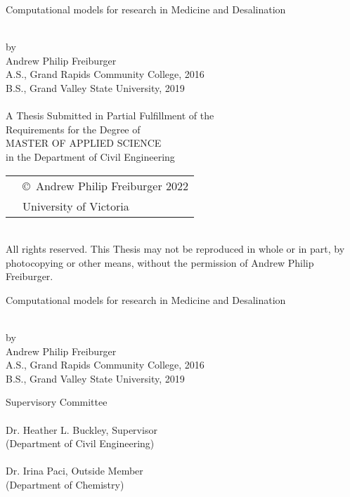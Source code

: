 \newcommand\thesistitle{
    Computational models for research in Medicine and Desalination 
}
\newcommand\nameanddegrees{
Andrew Philip Freiburger\\
A.S., Grand Rapids Community College, 2016\\
B.S., Grand Valley State University, 2019\\
}
\newcommand\panel{
    \HRule\\\panelist{Dr. Heather L. Buckley}{Supervisor}{Department of Civil Engineering}
    \HRule\\\panelist{Dr. Irina Paci}{Outside Member}{Department of Chemistry}
}

\newcommand\tpbreak{\\[\baselineskip]}
\newpage
\thispagestyle{empty}

\pagestyle{myheadings}

\pagebreak
{
    \centering
    \thesistitle
    \tpbreak
    
    by
    \tpbreak
    \nameanddegrees 
    \tpbreak
    A Thesis Submitted in Partial Fulfillment of the \\
    Requirements for the Degree of
    \tpbreak
    MASTER OF APPLIED SCIENCE
    \tpbreak
    in the Department of Civil Engineering\\
    \vfill
    \begin{tabular}{cl}
        & \copyright\ Andrew Philip Freiburger 2022\\
        & \phantom{\copyright} University of Victoria
    \end{tabular}
    \tpbreak
    All rights reserved. This Thesis may not be reproduced in whole or in part, by \\
    \hfill photocopying or other means, without the permission of Andrew Philip Freiburger. 
    \hfill
}
\pagebreak

\newpage
{}
{
    \centering
    \thesistitle
    \tpbreak
    by
    \tpbreak
    \nameanddegrees
}
\newcommand\panelist[3]{\noindent #1, #2\\\noindent(#3)\tpbreak}
\vfill
\noindent Supervisory Committee
\tpbreak
\panel
\vfill
\pagebreak

